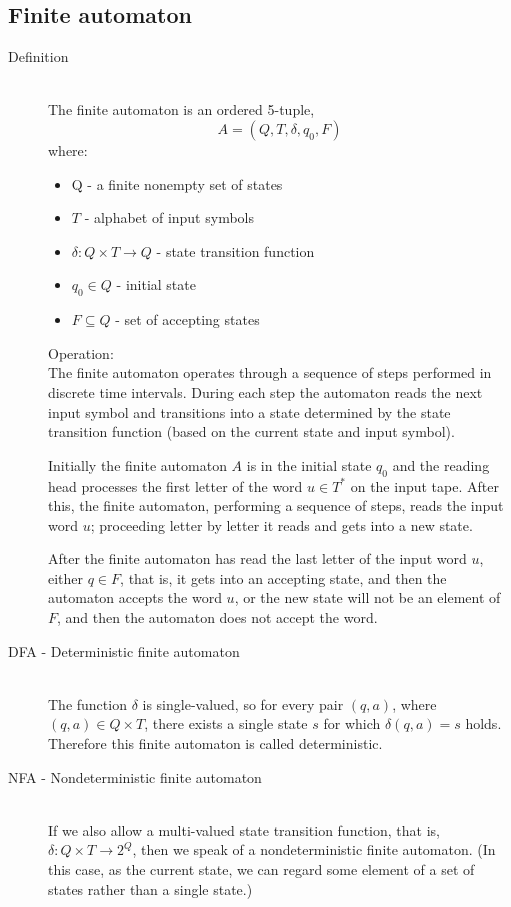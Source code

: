 \documentclass[margin=0px]{article}
\begin{document}
\subsection{Finite automaton}
\begin{description}
    \item[Definition] \hfill \\
        The finite automaton is an ordered 5-tuple,
        \[A=(Q,T,\delta,q_0, F)\]
        where:
        \begin{itemize}
            \item Q - a finite nonempty set of states
            \item $T$ - alphabet of input symbols
            \item $\delta : Q \times T \rightarrow Q$ - state transition function
            \item $q_0 \in Q$ - initial state
            \item $F \subseteq Q$ - set of accepting states
        \end{itemize}

        Operation:\\
        The finite automaton operates through a sequence of steps performed in discrete time intervals. During each step the automaton reads the next input symbol and transitions into a state determined by the state transition function (based on the current state and input symbol).

        Initially the finite automaton $A$ is in the initial state $q_0$ and the reading head processes the first letter of the word $u \in T^*$ on the input tape. After this, the finite automaton, performing a sequence of steps, reads the input word $u$; proceeding letter by letter it reads and gets into a new state.

        After the finite automaton has read the last letter of the input word $u$, either $q \in F$, that is, it gets into an accepting state, and then the automaton accepts the word $u$, or the new state will not be an element of $F$, and then the automaton does not accept the word.


    \item[DFA - Deterministic finite automaton] \hfill \\
        The function $\delta$ is single-valued, so for every pair $(q, a)$, where $(q, a) \in Q \times T$, there exists a single state $s$ for which $\delta(q, a) = s$ holds. Therefore this finite automaton is called deterministic.
    \item[NFA - Nondeterministic finite automaton] \hfill \\
        If we also allow a multi-valued state transition function, that is, $\delta : Q \times T \rightarrow 2^Q$, then we speak of a nondeterministic finite automaton. (In this case, as the current state, we can regard some element of a set of states rather than a single state.)


\end{description}
\end{document}
